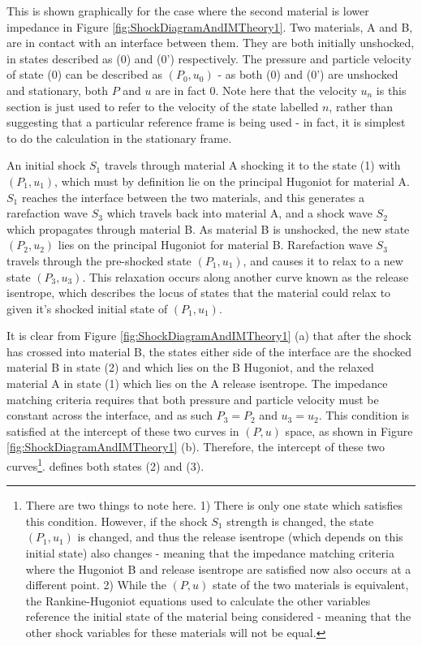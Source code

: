 This is shown graphically for the case where the second material is lower impedance in Figure \ref{fig:ShockDiagramAndIMTheory1}. Two materials, A and B, are in contact with an interface between them. They are both initially unshocked, in states described as (0) and (0') respectively. The pressure and particle velocity of state (0) can be described as $(P_0, u_0)$ - as both (0) and (0') are unshocked and stationary, both $P$ and $u$ are in fact 0. Note here that the velocity $u_n$ is this section is just used to refer to the velocity of the state labelled $n$, rather than suggesting that a particular reference frame is being used - in fact, it is simplest to do the calculation in the stationary frame.

An initial shock $S_1$ travels through material A shocking it to the state (1) with $(P_1, u_1)$, which must by definition lie on the principal Hugoniot for material A. $S_1$ reaches the interface between the two materials, and this generates a rarefaction wave $S_3$ which travels back into material A, and a shock wave $S_2$ which propagates through material B. As material B is unshocked, the new state $(P_2, u_2)$ lies on the principal Hugoniot for material B. Rarefaction wave $S_3$ travels through the pre-shocked state $(P_1, u_1)$, and causes it to relax to a new state $(P_3, u_3)$. This relaxation occurs along another curve known as the release isentrope, which describes the locus of states that the material could relax to given it's shocked initial state of $(P_1, u_1)$. 

It is clear from Figure \ref{fig:ShockDiagramAndIMTheory1} (a) that after the shock has crossed into material B, the states either side of the interface are the shocked material B in state (2) and which lies on the B Hugoniot, and the relaxed material A in state (1) which lies on the A release isentrope. The impedance matching criteria requires that both pressure and particle velocity must be constant across the interface, and as such $P_3 = P_2$ and $u_3 = u_2$. This condition is satisfied at the intercept of these two curves in $(P, u)$ space, as shown in Figure \ref{fig:ShockDiagramAndIMTheory1} (b). Therefore, the intercept of these two curves\footnote{There are two things to note here. 1) There is only one state which satisfies this condition. However, if the shock $S_1$ strength is changed, the state $(P_1, u_1)$ is changed, and thus the release isentrope (which depends on this initial state) also changes - meaning that the impedance matching criteria where the Hugoniot B and release isentrope are satisfied now also occurs at a different point. 2) While the $(P,u)$ state of the two materials is equivalent, the Rankine-Hugoniot equations used to calculate the other variables reference the initial state of the material being considered - meaning that the other shock variables for these materials will not be equal.}. defines both states (2) and (3). 

